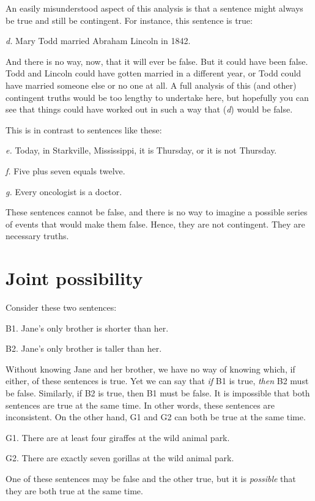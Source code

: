 An easily misunderstood aspect of this analysis is that a sentence might always be true and still be contingent. For instance, this sentence is true: 
	\begin{earg}
		\item[\textit{d.}] Mary Todd married Abraham Lincoln in 1842. 
	\end{earg}
And there is no way, now, that it will ever be false. But it could have been false. Todd and Lincoln could have gotten married in a different  year, or Todd could have married someone else or no one at all. A full analysis of this (and other) contingent truths would be too lengthy to undertake here, but hopefully you can see that things could have worked out in such a way that (\textit{d}) would be false. 

This is in contrast to sentences like these: 
\begin{earg}
	\item[\textit{e.}] Today, in Starkville, Mississippi, it is Thursday, or it is not Thursday. 
	\item[\textit{f.}] Five plus seven equals twelve.
	\item[\textit{g.}] Every oncologist is a doctor. 
\end{earg}
These sentences cannot be false, and there is no way to imagine a possible series of events that would make them false. Hence, they are not contingent. They are necessary truths. 


\section{Joint possibility}\label{s:joint-poss}

Consider these two sentences:
	\begin{ebullet}
		\item[B1.] Jane's only brother is shorter than her.
		\item[B2.] Jane's only brother is taller than her.
	\end{ebullet}
Without knowing Jane and her brother, we have no way of knowing which, if either, of these sentences is true. Yet we can say that \emph{if} B1 is true, \emph{then} B2 must be false. Similarly, if B2 is true, then B1 must be false. It is impossible that both sentences are true at the same time. In other words, these sentences are inconsistent. On the other hand, G1 and G2 can both be true at the same time.
	\begin{ebullet}	
		\item[G1.] \label{MartianGiraffes} There are at least four giraffes at the wild animal park.
		\item[G2.] There are exactly seven gorillas at the wild animal park.
	\end{ebullet}
One of these sentences may be false and the other true, but it  is \textit{possible} that they are both true at the same time. 

